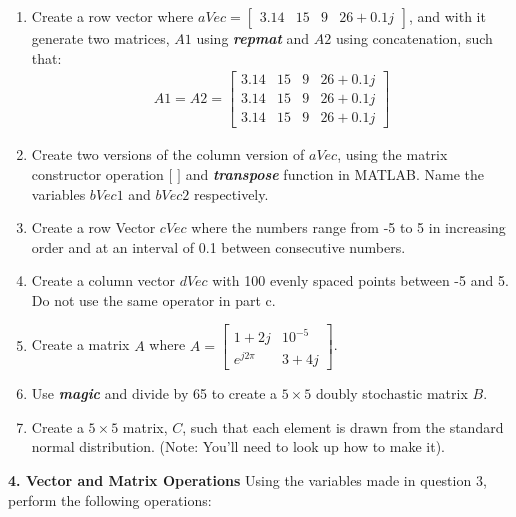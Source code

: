 \documentclass[11pt]{article}
\newenvironment{qparts}{\begin{enumerate}[{(}a{)}]}{\end{enumerate}}
\begin{document}
\begin{qparts}
    \item Create a row vector where 
    $ aVec = \begin{bmatrix}3.14&15&9&26+0.1j\end{bmatrix}$,
    and with it generate two matrices, $A1$ using \textbf{\textit{repmat}}
    and $A2$ using concatenation, such that:
    \begin{align*}
    A1 = A2 = \begin{bmatrix}3.14&15&9& 26+0.1j \\ 3.14&15&9&26+0.1j\\3.14&15&9&26+0.1j\end{bmatrix}
    \end{align*}

    \item Create two versions of the column version of $aVec$,
    using the matrix constructor operation $[$ $]$ and
    \textbf{\textit{transpose}} function in MATLAB.
    Name the variables $bVec1$ and $bVec2$ respectively.

    \item Create a row Vector $cVec$ where the numbers range from -5 to 5
    in increasing order and at an interval of 0.1 between consecutive numbers.

    \item Create a column vector $dVec$ with 100 evenly spaced points between -5 and 5.
    Do not use the same operator in part c.

    \item Create a matrix $A$ where 
    $A = \begin{bmatrix} 1+2j&10^{-5}\\ e^{j2\pi}&3+4j \end{bmatrix}$.

    \item Use \textbf{\textit{magic}} and divide by 65 to create a $5 \times 5$
    doubly stochastic matrix $B$.

    \item Create a $5 \times 5$ matrix, $C$,
    such that each element is drawn from the standard normal distribution.
    (Note: You'll need to look up how to make it).

\end{qparts}

\noindent 
\newline
\textbf{4. Vector and Matrix Operations}
Using the variables made in question 3,
perform the following operations:
\end{document}
